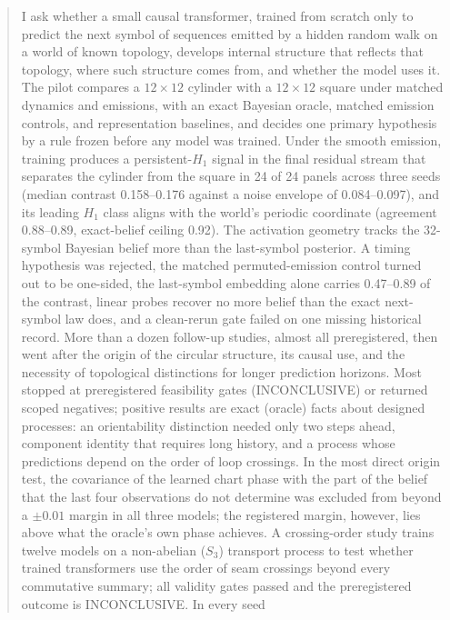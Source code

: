 \documentclass[11pt,a4paper]{article}
\DeclareRobustCommand{\_}{\ifmmode\origunderscore\else\textunderscore\allowbreak\fi}
\begin{document}
\begin{abstract}
\noindent
I ask whether a small causal transformer, trained from scratch only to predict the next
symbol of sequences emitted by a hidden random walk on a world of known topology, develops
internal structure that reflects that topology, where such structure comes from, and whether
the model uses it. The pilot compares a $12\times12$ cylinder with a $12\times12$ square under
matched dynamics and emissions, with an exact Bayesian oracle, matched emission controls, and
representation baselines, and decides one primary hypothesis by a rule frozen before any
model was trained. Under the smooth emission, training produces a persistent-$H_1$ signal in
the final residual stream that separates the cylinder from the square in 24 of 24 panels
across three seeds (median contrast 0.158--0.176 against a noise envelope of 0.084--0.097),
and its leading $H_1$ class aligns with the world's periodic coordinate (agreement 0.88--0.89,
exact-belief ceiling 0.92). The activation geometry tracks the 32-symbol Bayesian belief more
than the last-symbol posterior. A timing hypothesis was rejected, the matched permuted-emission
control turned out to be one-sided, the last-symbol embedding alone carries 0.47--0.89 of the
contrast, linear probes recover no more belief than the exact next-symbol law does, and a
clean-rerun gate failed on one missing historical record. More than a dozen follow-up
studies, almost all preregistered, then went after the origin of the circular structure, its causal use, and the necessity
of topological distinctions for longer prediction horizons. Most stopped at preregistered
feasibility gates (INCONCLUSIVE) or returned scoped negatives; positive results are exact
(oracle) facts about designed processes: an orientability distinction needed only two steps
ahead, component identity that requires long history, and a process whose predictions depend on
the order of loop crossings. In the most direct origin test,
the covariance of the learned chart phase with the part of the belief that the last four
observations do not determine was excluded from beyond a $\pm0.01$ margin in all three models;
the registered margin, however, lies above what the oracle's own phase achieves. A
crossing-order study trains twelve models on a non-abelian ($S_3$) transport process to test
whether trained transformers use the order of seam crossings beyond every commutative summary;
all validity gates passed and the preregistered outcome is INCONCLUSIVE. In every seed

\end{abstract}
\end{document}
